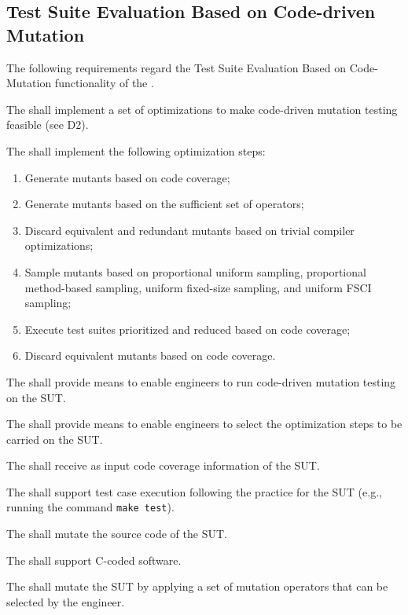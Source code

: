 

\subsection{Test Suite Evaluation Based on Code-driven Mutation}
\label{sec:codeDriven}

The following requirements regard the Test Suite Evaluation Based on Code-Mutation functionality of the \FAQAS.



\RQ{} The \FAQAS shall implement a set of optimizations to make code-driven mutation testing feasible (see D2).

\RQ{} The \FAQAS shall implement the following optimization steps:
\begin{enumerate}
	\item Generate mutants based on code coverage;
	\item Generate mutants based on the sufficient set of operators;
	\item Discard equivalent and redundant mutants based on trivial compiler optimizations;
	\item Sample mutants based on proportional uniform sampling, proportional method-based sampling, uniform fixed-size sampling, and uniform FSCI sampling;
	\item Execute test suites prioritized and reduced based on code coverage;
	\item Discard equivalent mutants based on code coverage.
\end{enumerate}

\RQ{} The \FAQAS shall provide means to enable engineers to run code-driven mutation testing on the SUT.

\RQ{} The \FAQAS shall provide means to enable engineers to select the optimization steps to be carried on the SUT.

\RQ{} The \FAQAS shall receive as input code coverage information of the SUT.

\RQ{} The \FAQAS shall support test case execution following the practice for the SUT (e.g., running the command \texttt{make test}).

\RQ{} The \FAQAS shall mutate the source code of the SUT.

\RQ{} The \FAQAS shall support C-coded software.

\RQ{} The \FAQAS shall mutate the SUT by applying a set of mutation operators that can be selected by the engineer.

